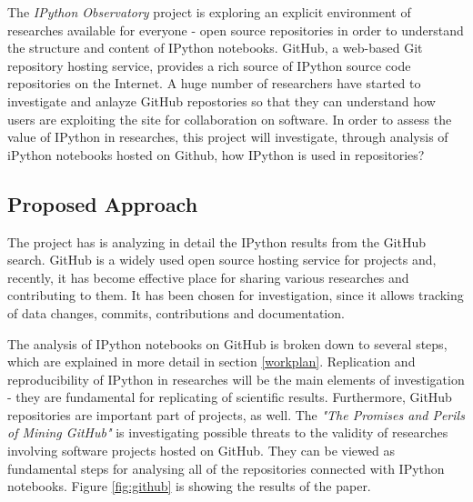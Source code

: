 The \textit{IPython Observatory} project is exploring an explicit environment of researches available for everyone - open source repositories in order to understand the structure and content of IPython notebooks. GitHub, a web-based Git repository hosting service, provides a rich source of IPython source code repositories on the Internet.\cite{gitHubWiki} A huge number of researchers have started to investigate and anlayze GitHub repostories so that they can understand how users are exploiting the site for collaboration on software. \cite{kalliamvakou2007promises} In order to assess the value of IPython in researches, this project will investigate, through analysis of iPython notebooks hosted on Github, how IPython is used in repositories?

\subsection{Proposed Approach}

The project has is analyzing in detail the IPython results from the GitHub search. GitHub is a widely used open source hosting service for projects and, recently, it has become effective place for sharing various researches and contributing to them. It has been chosen for investigation, since it allows tracking of data changes, commits, contributions and documentation. 

The analysis of IPython notebooks on GitHub is broken down to several steps, which are explained in more detail in section \ref{workplan}. Replication and reproducibility of IPython in researches will be the main elements of investigation - they are fundamental for replicating of scientific results. Furthermore, GitHub repositories are important part of projects, as well. The \textit{"The Promises and Perils of Mining GitHub"} is investigating possible threats to the validity of researches involving software projects hosted on GitHub.\cite{kalliamvakoupromises} They can be viewed as fundamental steps for analysing all of the repositories connected with IPython notebooks. Figure \ref{fig:github} is showing the results of the paper. 

